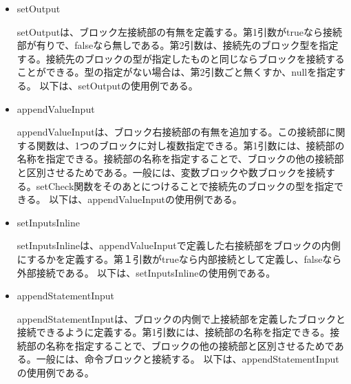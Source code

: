 \documentclass{risepaper}
\begin{document}
\begin{itemize}
\item setOutput

setOutputは、ブロック左接続部の有無を定義する。第1引数がtrueなら接続部が有りで、falseなら無しである。第2引数は、接続先のブロック型を指定する。接続先のブロックの型が指定したものと同じならブロックを接続することができる。型の指定がない場合は、第2引数ごと無くすか、nullを指定する。
以下は、setOutputの使用例である。


\item appendValueInput

appendValueInputは、ブロック右接続部の有無を追加する。この接続部に関する関数は、1つのブロックに対し複数指定できる。第1引数には、接続部の名称を指定できる。接続部の名称を指定することで、ブロックの他の接続部と区別させるためである。一般には、変数ブロックや数ブロックを接続する。setCheck関数をそのあとにつけることで接続先のブロックの型を指定できる。
以下は、appendValueInputの使用例である。


\item setInputsInline

setInputsInlineは、appendValueInputで定義した右接続部をブロックの内側にするかを定義する。第１引数がtrueなら内部接続として定義し、falseなら外部接続である。
以下は、setInputsInlineの使用例である。


\item appendStatementInput

appendStatementInputは、ブロックの内側で上接続部を定義したブロックと接続できるように定義する。第1引数には、接続部の名称を指定できる。接続部の名称を指定することで、ブロックの他の接続部と区別させるためである。一般には、命令ブロックと接続する。
以下は、appendStatementInputの使用例である。


\end{itemize}
\end{document}
